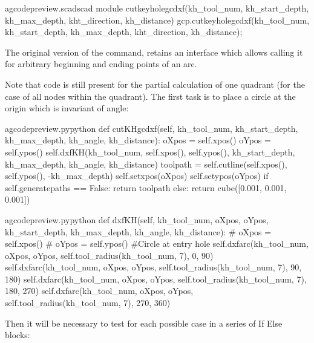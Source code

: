 \documentclass{ltxdoc}
\begin{document}
\lstset{firstnumber=\thegcpscad}
\begin{writecode}{a}{gcodepreview.scad}{scad}
module cutkeyholegcdxf(kh_tool_num, kh_start_depth, kh_max_depth, kht_direction, kh_distance){
    gcp.cutkeyholegcdxf(kh_tool_num, kh_start_depth, kh_max_depth, kht_direction, kh_distance);
}

\end{writecode}
\addtocounter{gcpscad}{4}

 
The original version of the command,  retains an interface which allows calling it for arbitrary beginning and ending points of an arc. 

Note that code is still present for the partial calculation of one quadrant (for the case of all nodes within the quadrant). The first task is to place a circle at the origin which is invariant of angle:
 
\lstset{firstnumber=\thegcpy}
\begin{writecode}{a}{gcodepreview.py}{python}
    def cutKHgcdxf(self, kh_tool_num, kh_start_depth, kh_max_depth, kh_angle, kh_distance):
        oXpos = self.xpos()
        oYpos = self.ypos()
        self.dxfKH(kh_tool_num, self.xpos(), self.ypos(), kh_start_depth, kh_max_depth, kh_angle, kh_distance)
        toolpath = self.cutline(self.xpos(), self.ypos(), -kh_max_depth)
        self.setxpos(oXpos)
        self.setypos(oYpos)
        if self.generatepaths == False:
            return toolpath
        else: 
            return cube([0.001, 0.001, 0.001])

\end{writecode}
\addtocounter{gcpy}{12}

\lstset{firstnumber=\thegcpy}
\begin{writecode}{a}{gcodepreview.py}{python}
    def dxfKH(self, kh_tool_num, oXpos, oYpos, kh_start_depth, kh_max_depth, kh_angle, kh_distance):
#        oXpos = self.xpos()
#        oYpos = self.ypos()
#Circle at entry hole
        self.dxfarc(kh_tool_num, oXpos, oYpos, self.tool_radius(kh_tool_num, 7), 0, 90)
        self.dxfarc(kh_tool_num, oXpos, oYpos, self.tool_radius(kh_tool_num, 7), 90, 180)
        self.dxfarc(kh_tool_num, oXpos, oYpos, self.tool_radius(kh_tool_num, 7), 180, 270)
        self.dxfarc(kh_tool_num, oXpos, oYpos, self.tool_radius(kh_tool_num, 7), 270, 360)

\end{writecode}
\addtocounter{gcpy}{9}

Then it will be necessary to test for each possible case in a series of If Else blocks:
 
\end{document}
